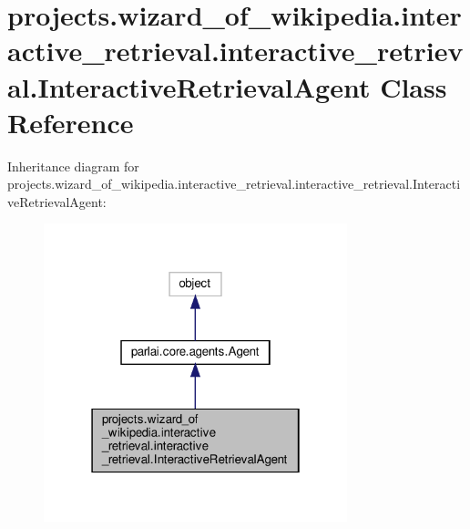 \hypertarget{classprojects_1_1wizard__of__wikipedia_1_1interactive__retrieval_1_1interactive__retrieval_1_1InteractiveRetrievalAgent}{}\section{projects.\+wizard\+\_\+of\+\_\+wikipedia.\+interactive\+\_\+retrieval.\+interactive\+\_\+retrieval.\+Interactive\+Retrieval\+Agent Class Reference}
\label{classprojects_1_1wizard__of__wikipedia_1_1interactive__retrieval_1_1interactive__retrieval_1_1InteractiveRetrievalAgent}


Inheritance diagram for projects.\+wizard\+\_\+of\+\_\+wikipedia.\+interactive\+\_\+retrieval.\+interactive\+\_\+retrieval.\+Interactive\+Retrieval\+Agent\+:
\nopagebreak
\begin{figure}[H]
\begin{center}
\leavevmode
\includegraphics[width=250pt]{d9/d07/classprojects_1_1wizard__of__wikipedia_1_1interactive__retrieval_1_1interactive__retrieval_1_1Ine5f49c6d75338c69ea75c18db7949361}
\end{center}
\end{figure}


